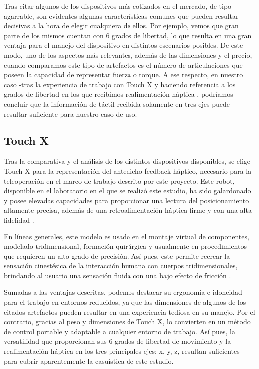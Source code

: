 Tras citar algunos de los dispositivos más cotizados en el mercado, de tipo agarrable, son evidentes algunas características comunes que pueden resultar decisivas a la hora de elegir cualquiera de ellos. Por ejemplo, vemos que gran parte de los mismos cuentan con 6 grados de libertad, lo que resulta en una gran ventaja para el manejo del dispositivo en distintos escenarios posibles. De este modo, uno de los aspectos más relevantes, además de las dimensiones y el precio, cuando comparamos este tipo de artefactos es el número de articulaciones que poseen la capacidad de representar fuerza o torque. A ese respecto, en nuestro caso -tras la experiencia de trabajo con Touch X y haciendo referencia a los grados de libertad en los que recibimos realimentación háptica-, podríamos concluir que la información de táctil recibida solamente en tres ejes puede resultar suficiente para nuestro caso de uso.   

\subsection{Touch X}
Tras la comparativa y el análisis de los distintos dispositivos disponibles, se elige Touch X para la representación del antedicho feedback háptico, necesario para la teleoperación en el marco de trabajo descrito por este proyecto. Este robot, disponible en el laboratorio en el que se realizó este estudio, ha sido galardonado y posee elevadas capacidades para proporcionar una lectura del posicionamiento altamente precisa, además de una retroalimentación háptica firme y con una alta fidelidad \cite{58}. 

En líneas generales, este modelo es usado en el montaje virtual de componentes, modelado tridimensional, formación quirúrgica y usualmente en procedimientos que requieren un alto grado de precisión. Así pues, este permite recrear la sensación cinestésica de la interacción humana con cuerpos tridimensionales, brindando al usuario una sensación fluida con una bajo efecto de fricción \cite{59}.

Sumadas a las ventajas descritas, podemos destacar su ergonomía e idoneidad para el trabajo en entornos reducidos, ya que las dimensiones de algunos de los citados artefactos pueden resultar en una experiencia tediosa en su manejo. Por el contrario, gracias al peso y dimensiones de Touch X, lo convierten en un método de control portable y adaptable a cualquier entorno de trabajo. Así pues,  la versatilidad que proporcionan sus 6 grados de libertad de movimiento y la realimentación háptica en los tres principales ejes: x, y, z, resultan suficientes para cubrir aparentemente la casuística de este estudio. 


